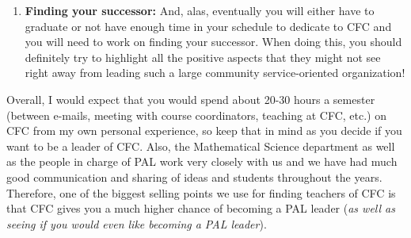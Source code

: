 \documentclass[paper=a4, fontsize=11pt]{scrartcl} %
\numberwithin{equation}{section} %
\numberwithin{figure}{section} %
\numberwithin{table}{section} %
\begin{document}
\begin{enumerate}
\item \textbf{Finding your successor:} And, alas, eventually you will either have to graduate or not have enough time in your schedule to dedicate to CFC and you will need to work on finding your successor.  When doing this, you should definitely try to highlight all the positive aspects that they might not see right away from leading such a large community service-oriented organization!
\end{enumerate}

Overall, I would expect that you would spend about 20-30 hours a semester (between e-mails, meeting with course coordinators, teaching at CFC, etc.) on CFC from my own personal experience, so keep that in mind as you decide if you want to be a leader of CFC.  Also, the Mathematical Science department as well as the people in charge of PAL work very closely with us and we have had much good communication and sharing of ideas and students throughout the years.  Therefore, one of the biggest selling points we use for finding teachers of CFC is that CFC gives you a much higher chance of becoming a PAL leader (\textit{as well as seeing if you would even like becoming a PAL leader}). 
\end{document}
